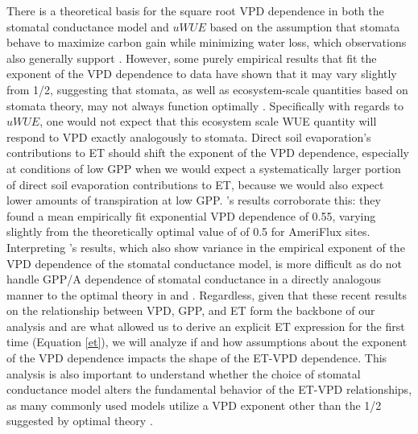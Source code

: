 There is a theoretical basis for the square root VPD dependence in
both the stomatal conductance model and $uWUE$ based on the assumption
that stomata behave to maximize carbon gain while minimizing water
loss, which observations also generally support \citep{Lloyd_1991,
  MEDLYN_2011, Lin_2015, Zhou_2014, Zhou_2015, Medlyn_2017}. However,
some purely empirical results that fit the exponent of the VPD
dependence to data have shown that it may vary slightly from 1/2,
suggesting that stomata, as well as ecosystem-scale quantities based
on stomata theory, may not always function optimally \citep{Zhou_2015,
  Lin_2018}. Specifically with regards to $uWUE$, one would not expect
that this ecosystem scale WUE quantity will respond to VPD exactly
analogously to stomata. Direct soil evaporation's contributions to ET
should shift the exponent of the VPD dependence, especially at
conditions of low GPP when we would expect a systematically larger
portion of direct soil evaporation contributions to ET, because we
would also expect lower amounts of transpiration at low GPP. \citet{Zhou_2015}'s
results corroborate this: they found a mean empirically fit
exponential VPD dependence of 0.55, varying slightly from the
theoretically optimal value of of 0.5 for AmeriFlux
sites. Interpreting \citet{Lin_2018}'s results, which also show
variance in the empirical exponent of the VPD dependence of the
stomatal conductance model, is more difficult as \citet{Lin_2018} do
not handle GPP/A dependence of stomatal conductance in a directly
analogous manner to the optimal theory in \citet{MEDLYN_2011} and
\citet{Medlyn_2017}. Regardless, given that these recent results on
the relationship between VPD, GPP, and ET \citep{MEDLYN_2011,
  Zhou_2014, Zhou_2015, Medlyn_2017} form the backbone of our analysis
and are what allowed us to derive an explicit ET expression for the
first time (Equation \ref{et}), we will analyze if and how assumptions
about the exponent of the VPD dependence impacts the shape of the
ET-VPD dependence. This analysis is also important to understand whether the choice of stomatal conductance model alters the fundamental behavior of the ET-VPD relationships, as many commonly used models  utilize a VPD exponent other than the 1/2 suggested by optimal theory \citep[e.g. ][ which uses an exponent of 1]{Leuning_1990}.

